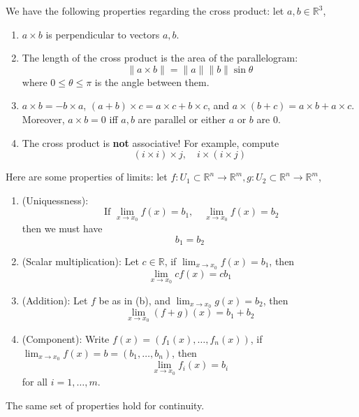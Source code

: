 \documentclass[openany]{book}
\newcommand{\R}{\mathbb{R}}
\begin{document}
\begin{prop}
    We have the following properties regarding the cross product: let $a,b\in\R^3$,
    \begin{enumerate}
        \item $a\times b$ is perpendicular to vectors $a,b$.
        \item The length of the cross product is the area of the parallelogram:
        \begin{equation*}
            \|a\times b\|=\|a\|\|b\|\sin\theta
        \end{equation*}
        where $0\leq\theta\leq\pi$ is the angle between them. 
        \item $a\times b=-b\times a$, $(a+b)\times c=a\times c+b\times c$, and $a\times (b+c)=a\times b+a\times c$. Moreover, $a\times b=0$ iff $a,b$ are parallel or either $a$ or $b$ are $0$.
        \item The cross product is \textbf{not} associative! For example, compute 
        \begin{equation*}
            (i\times i)\times j, \quad i\times (i\times j)
        \end{equation*}
    \end{enumerate}
\end{prop}



\begin{prop}[limits]
    Here are some properties of limits: let $f: U_1\subset\R^n\to\R^m, g: U_2\subset\R^n\to\R^m$,
    \begin{enumerate}
        \item[(a)] (Uniquessness):  \begin{equation*}
            \text{ If } \lim_{x\to x_0}f(x)=b_1, \quad \lim_{x\to x_0}f(x)=b_2
        \end{equation*}
        then we must have 
        \begin{equation*}
            b_1=b_2
        \end{equation*}
        \item[(b)] (Scalar multiplication): Let $c\in\R$, if $\lim_{x\to x_0}f(x)=b_1$, then 
        \begin{equation*}
            \lim_{x\to x_0}cf(x)=cb_1
        \end{equation*}
        \item[(c)] (Addition): Let $f$ be as in (b), and $\lim_{x\to x_0}g(x)=b_2$, then 
        \begin{equation*}
            \lim_{x\to x_0}(f+g)(x)=b_1+b_2
        \end{equation*}
        \item[(d)] (Component): Write $f(x)=(f_1(x),\dots, f_n(x))$, if $\lim_{x\to x_0}f(x)=b=(b_1,\dots, b_n)$, then 
        \begin{equation*}
            \lim_{x\to x_0}f_i(x)=b_i
        \end{equation*}
        for all $i=1,\dots, m$.
    \end{enumerate}
    The same set of properties hold for continuity.
\end{prop}
\end{document}
